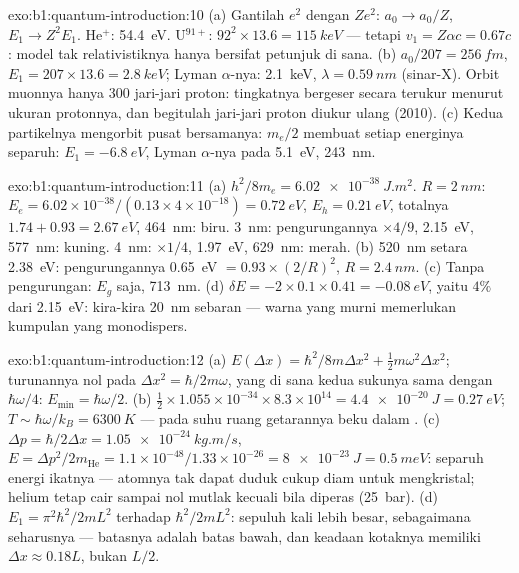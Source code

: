 \begin{solution}{exo:b1:quantum-introduction:10}
(a) Gantilah $e^2$ dengan $Ze^2$: $a_0 \to a_0/Z$, $E_1 \to Z^2E_1$. He$^+$:
\qty{54.4}{eV}. U$^{91+}$: $92^2 \times 13.6 = \qty{115}{keV}$ --- tetapi $v_1 = Z\alpha c
= 0.67c$: model tak relativistiknya hanya bersifat petunjuk di sana. (b) $a_0/207
= \qty{256}{fm}$, $E_1 = 207 \times 13.6 = \qty{2.8}{keV}$; Lyman $\alpha$-nya:
\qty{2.1}{keV}, $\lambda = \qty{0.59}{nm}$ (sinar-X). Orbit muonnya hanya
$300$ jari-jari proton: tingkatnya bergeser secara terukur menurut ukuran protonnya,
dan begitulah jari-jari proton diukur ulang (2010). (c) Kedua
partikelnya mengorbit pusat bersamanya:  $m_e/2$ membuat
setiap energinya separuh: $E_1 = \qty{-6.8}{eV}$, Lyman $\alpha$-nya pada \qty{5.1}{eV}, \qty{243}{nm}.
\end{solution}

\begin{solution}{exo:b1:quantum-introduction:11}
(a) $h^2/8m_e = \qty{6.02e-38}{J.m^2}$. $R = \qty{2}{nm}$: $E_e = 6.02 \times 10^{-38}/
(0.13 \times 4 \times 10^{-18}) = \qty{0.72}{eV}$, $E_h = \qty{0.21}{eV}$, totalnya $1.74 +
0.93 = \qty{2.67}{eV}$, \qty{464}{nm}: biru. \qty{3}{nm}: pengurungannya $\times4/9$,
\qty{2.15}{eV}, \qty{577}{nm}: kuning. \qty{4}{nm}: $\times1/4$, \qty{1.97}{eV},
\qty{629}{nm}: merah. (b) \qty{520}{nm} setara \qty{2.38}{eV}: pengurungannya \qty{0.65}{eV}
$= 0.93 \times (2/R)^2$, $R = \qty{2.4}{nm}$. (c) Tanpa pengurungan: $E_g$ saja,
\qty{713}{nm}. (d) $\delta E = -2 \times 0.1 \times 0.41 = \qty{-0.08}{eV}$, yaitu $4\%$ dari
\qty{2.15}{eV}: kira-kira \qty{20}{nm} sebaran --- warna yang murni memerlukan
kumpulan yang monodispers.
\end{solution}

\begin{solution}{exo:b1:quantum-introduction:12}
(a) $E(\Delta x) = \hbar^2/8m\Delta x^2 + \tfrac12m\omega^2\Delta x^2$; turunannya nol pada
$\Delta x^2 = \hbar/2m\omega$, yang di sana kedua sukunya sama dengan $\hbar\omega/4$: $E_{\min} =
\hbar\omega/2$. (b) $\tfrac12 \times 1.055 \times 10^{-34} \times 8.3 \times 10^{14} = \qty{4.4e-20}{J}
= \qty{0.27}{eV}$; $T \sim \hbar\omega/k_B = \qty{6300}{K}$ --- pada suhu ruang
getarannya beku dalam . (c) $\Delta p = \hbar/2\Delta x =
\qty{1.05e-24}{kg.m/s}$, $E = \Delta p^2/2m_{\mathrm{He}} = 1.1 \times 10^{-48}/1.33 \times
10^{-26} = \qty{8e-23}{J} = \qty{0.5}{meV}$: separuh energi ikatnya --- atomnya tak dapat
duduk cukup diam untuk mengkristal; helium tetap cair sampai nol
mutlak kecuali bila diperas (\qty{25}{bar}). (d) $E_1 = \pi^2\hbar^2/2mL^2$ terhadap
$\hbar^2/2mL^2$: sepuluh kali lebih besar, sebagaimana seharusnya --- batasnya adalah batas
bawah, dan keadaan kotaknya memiliki $\Delta x \approx 0.18L$, bukan $L/2$.
\end{solution}


